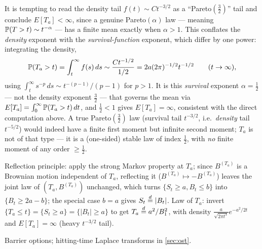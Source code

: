 \begin{trap} \label{chap2.4:trap-density_vs_survival_tail} \\
It is tempting to read the density tail $f(t)\sim Ct^{-3/2}$ as a ``Pareto$(\frac32)$'' tail and conclude $E[T_a]<\infty$, since a genuine Pareto$(\alpha)$ law --- meaning $\mathbb{P}(T>t)\sim t^{-\alpha}$ --- has a finite mean exactly when $\alpha>1$. This conflates the \emph{density} exponent with the \emph{survival-function} exponent, which differ by one power: integrating the density,
$$\mathbb{P}(T_a>t)=\int_t^\infty f(s)\,ds\sim\frac{Ct^{-1/2}}{1/2}=2a(2\pi)^{-1/2}t^{-1/2}\qquad(t\to\infty),$$
using $\int_t^\infty s^{-p}\,ds\sim t^{-(p-1)}/(p-1)$ for $p>1$. It is this \emph{survival} exponent $\alpha=\frac12$ --- not the density exponent $\frac32$ --- that governs the mean via $E[T_a]=\int_0^\infty\mathbb{P}(T_a>t)\,dt$, and $\frac12<1$ gives $E[T_a]=\infty$, consistent with the direct computation above. A true Pareto$(\frac32)$ law (survival tail $t^{-3/2}$, i.e.\ \emph{density} tail $t^{-5/2}$) would indeed have a finite first moment but infinite second moment; $T_a$ is not of that type --- it is a (one-sided) stable law of index $\frac12$, with \emph{no} finite moment of any order $\ge\frac12$.
\end{trap}

\begin{quizbox} Reflection principle: apply the strong Markov property at $T_a$; since $B^{(T_a)}$ is a Brownian motion independent of $T_a$, reflecting it ($B^{(T_a)}\mapsto-B^{(T_a)}$) leaves the joint law of $(T_a,B^{(T_a)})$ unchanged, which turns $\{S_t\ge a,B_t\le b\}$ into $\{B_t\ge2a-b\}$; the special case $b=a$ gives $S_t\overset{d}{=}|B_t|$. Law of $T_a$: invert $\{T_a\le t\}=\{S_t\ge a\}=\{|B_t|\ge a\}$ to get $T_a\overset{d}{=} a^2/B_1^2$, with density $\frac{a}{\sqrt{2\pi t^3}}e^{-a^2/2t}$ and $E[T_a]=\infty$ (heavy $t^{-3/2}$ tail). \end{quizbox}
\begin{usedin} Barrier options; hitting-time Laplace transforms in \cref{sec:ost}. \end{usedin}

